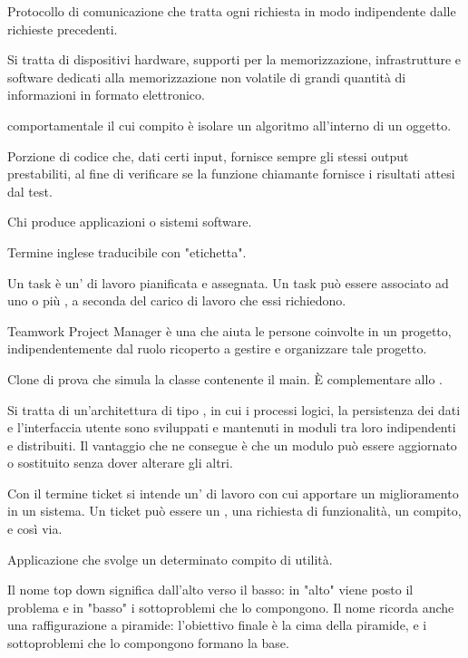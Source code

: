 Protocollo di comunicazione che tratta ogni richiesta in modo indipendente dalle richieste precedenti.

Si tratta di dispositivi hardware, supporti per la memorizzazione, infrastrutture e software dedicati alla memorizzazione non volatile di grandi quantità di informazioni in formato elettronico.

 comportamentale il cui compito è isolare un algoritmo all'interno di un oggetto.

Porzione di codice che, dati certi input, fornisce sempre gli stessi output prestabiliti, al fine di verificare se la funzione chiamante fornisce i risultati attesi dal test.

Chi produce applicazioni o sistemi software.


Termine inglese traducibile con "etichetta". 

Un task è un' di lavoro pianificata e assegnata. Un task può essere associato ad uno o più , a seconda del carico di lavoro che essi richiedono.

Teamwork Project Manager è una  che aiuta le persone coinvolte in un progetto, indipendentemente dal ruolo ricoperto a gestire e organizzare tale progetto.

Clone di prova che simula la classe contenente il main. È complementare allo .

Si tratta di un'architettura di tipo , in cui i processi logici, la persistenza dei dati e l'interfaccia utente sono sviluppati e mantenuti in moduli tra loro indipendenti e distribuiti. Il vantaggio che ne consegue è che un modulo può essere aggiornato o sostituito senza dover alterare gli altri.

Con il termine ticket si intende un' di lavoro con cui apportare un miglioramento in un sistema. Un ticket può essere un , una richiesta di funzionalità, un compito, e così via.

Applicazione che svolge un determinato compito di utilità.

Il nome top down significa dall'alto verso il basso: in "alto" viene posto il problema e in "basso" i sottoproblemi che lo compongono. Il nome ricorda anche una raffigurazione a piramide: l'obiettivo finale è la cima della piramide, e i sottoproblemi che lo compongono formano la base.

